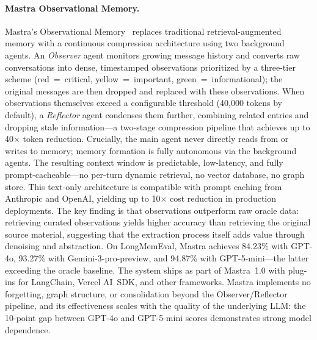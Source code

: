 \paragraph{Mastra Observational Memory.}
Mastra's Observational Memory~\cite{mastra2026} replaces traditional
retrieval-augmented memory with a continuous compression architecture
using two background agents.  An \emph{Observer} agent monitors growing
message history and converts raw conversations into dense, timestamped
observations prioritized by a three-tier scheme (red~=~critical,
yellow~=~important, green~=~informational); the original messages
are then dropped and replaced with these observations.  When observations
themselves exceed a configurable threshold (40{,}000 tokens by default),
a \emph{Reflector} agent condenses them further, combining related
entries and dropping stale information---a two-stage compression pipeline
that achieves up to 40$\times$ token reduction.  Crucially, the main
agent never directly reads from or writes to memory; memory formation is
fully autonomous via the background agents.  The resulting context window
is predictable, low-latency, and fully prompt-cacheable---no per-turn
dynamic retrieval, no vector database, no graph store.  This text-only
architecture is compatible with prompt caching from Anthropic and OpenAI,
yielding up to 10$\times$ cost reduction in production deployments.  The
key finding is that observations outperform raw oracle data: retrieving
curated observations yields higher accuracy than retrieving the original
source material, suggesting that the extraction process itself adds value
through denoising and abstraction.  On LongMemEval, Mastra achieves
84.23\% with GPT-4o, 93.27\% with Gemini-3-pro-preview, and 94.87\%
with GPT-5-mini---the latter exceeding the oracle baseline.  The system
ships as part of Mastra~1.0 with plug-ins for LangChain, Vercel AI~SDK,
and other frameworks.  Mastra implements no forgetting, graph structure,
or consolidation beyond the Observer/Reflector pipeline, and its
effectiveness scales with the quality of the underlying LLM: the 10-point
gap between GPT-4o and GPT-5-mini scores demonstrates strong model
dependence.

